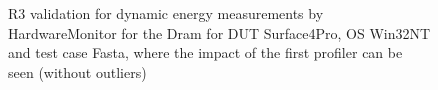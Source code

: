 \begin{figure}
                            \caption{R3 validation for dynamic energy measurements by HardwareMonitor for the Dram for DUT Surface4Pro, OS Win32NT and test case Fasta, where the impact of the first profiler can be seen (without outliers)} \label{fig:Surface4Pro_HardwareMonitor_Dram_R3_dynamic_energy_without_outliers_Win32NT_avg_watts}
                            \end{figure}
                            